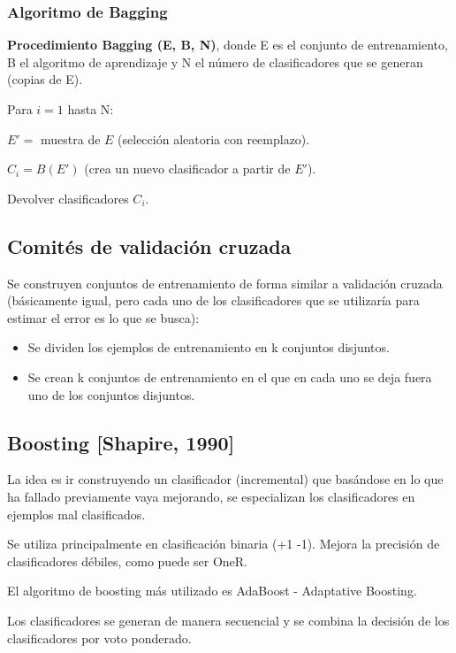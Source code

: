 \documentclass[12pt, twoside, openright]{report} %
\begin{document}
\subsubsection{Algoritmo de Bagging}
\textbf{Procedimiento Bagging (E, B, N)}, donde E es el conjunto de entrenamiento, B el algoritmo de aprendizaje y N el número de clasificadores que se generan (copias de E).

Para $i = 1$ hasta N:

\hspace{6mm} $E' =$ muestra de $E$ (selección aleatoria con reemplazo).

\hspace{6mm} $C_i = B(E')$ (crea un nuevo clasificador a partir de $E'$).

Devolver clasificadores $C_i$.

\subsection{Comités de validación cruzada}
Se construyen conjuntos de entrenamiento de forma similar a validación cruzada (básicamente igual, pero cada uno de los clasificadores que se utilizaría para estimar el error es lo que se busca):
\begin{itemize}
  \item Se dividen los ejemplos de entrenamiento en k conjuntos disjuntos.
  \item Se crean k conjuntos de entrenamiento en el que en cada uno se deja fuera uno de los conjuntos disjuntos.
\end{itemize}

\subsection{Boosting [Shapire, 1990]}
La idea es ir construyendo un clasificador (incremental) que basándose en lo que ha fallado previamente vaya mejorando, se especializan los clasificadores en ejemplos mal clasificados.

Se utiliza principalmente en clasificación binaria (+1 -1). Mejora la precisión de clasificadores débiles, como puede ser OneR.

El algoritmo de boosting más utilizado es AdaBoost - Adaptative Boosting.

Los clasificadores se generan de manera secuencial y se combina la decisión de los clasificadores por voto ponderado.
\end{document}
